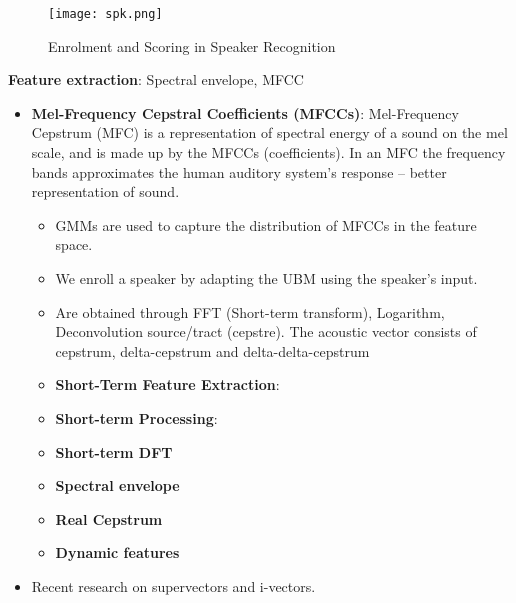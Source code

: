 \documentclass[a4paper]{article}
\begin{document}
      \begin{figure}[htp]
        \centering
          \texttt{[image: spk.png]}
          \caption{Enrolment and Scoring in Speaker Recognition}
          \label{fig:spk}
      \end{figure}

      \textbf{Feature extraction}: Spectral envelope, MFCC 
      \begin{itemize}
        \item \textbf{Mel-Frequency Cepstral Coefficients (MFCCs)}: Mel-Frequency Cepstrum (MFC) is a representation of spectral energy of a sound on the mel scale, and is made up by the MFCCs (coefficients). In an MFC the frequency bands approximates the human auditory system's response -- better representation of sound.
        \begin{itemize}
          \item GMMs are used to capture the distribution of MFCCs in the feature space.
          \item We enroll a speaker by adapting the UBM using the speaker's input.
          \item Are obtained through FFT (Short-term transform), Logarithm, Deconvolution source/tract (cepstre). The acoustic vector consists of cepstrum, delta-cepstrum and delta-delta-cepstrum
          \item \textbf{Short-Term Feature Extraction}: 
          \item \textbf{Short-term Processing}: 
          \item \textbf{Short-term DFT} 
          \item \textbf{Spectral envelope} 
          \item \textbf{Real Cepstrum}
          \item \textbf{Dynamic features}
        \end{itemize}
        \item Recent research on supervectors and i-vectors.
      \end{itemize}
\end{document}
